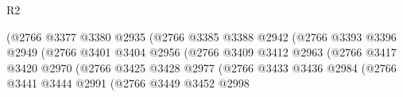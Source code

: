\begin{lexlean}{R2}
\begin{coremodule}
                                                  (@2766
                                                    @3377
                                                    @3380
                                                    @2935
                                                    (@2766
                                                      @3385
                                                      @3388
                                                      @2942
                                                      (@2766
                                                        @3393
                                                        @3396
                                                        @2949
                                                        (@2766
                                                          @3401
                                                          @3404
                                                          @2956
                                                          (@2766
                                                            @3409
                                                            @3412
                                                            @2963
                                                            (@2766
                                                              @3417
                                                              @3420
                                                              @2970
                                                              (@2766
                                                                @3425
                                                                @3428
                                                                @2977
                                                                (@2766
                                                                  @3433
                                                                  @3436
                                                                  @2984
                                                                  (@2766
                                                                    @3441
                                                                    @3444
                                                                    @2991
                                                                    (@2766
                                                                      @3449
                                                                      @3452
                                                                      @2998

\end{coremodule}
\end{lexlean}

